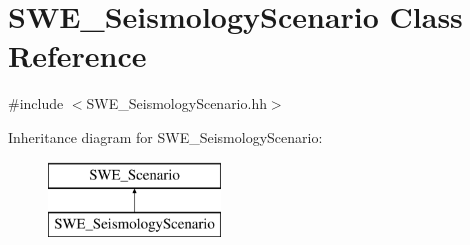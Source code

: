 \hypertarget{classSWE__SeismologyScenario}{\section{S\-W\-E\-\_\-\-Seismology\-Scenario Class Reference}
\label{classSWE__SeismologyScenario}
}


{\ttfamily \#include $<$S\-W\-E\-\_\-\-Seismology\-Scenario.\-hh$>$}

Inheritance diagram for S\-W\-E\-\_\-\-Seismology\-Scenario\-:\begin{figure}[H]
\begin{center}
\leavevmode
\includegraphics[height=2.000000cm]{classSWE__SeismologyScenario}
\end{center}
\end{figure}
